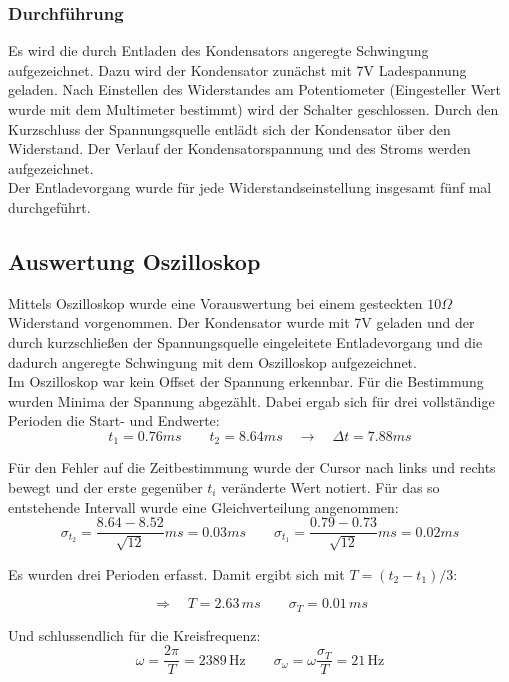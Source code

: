 \documentclass[12pt,a4paper]{article}
\begin{document}
\subsubsection{Durchführung}
Es wird die durch Entladen des Kondensators angeregte Schwingung aufgezeichnet. Dazu wird der Kondensator zunächst mit 7V Ladespannung geladen. Nach Einstellen des Widerstandes am Potentiometer (Eingesteller Wert wurde mit dem Multimeter bestimmt) wird der Schalter geschlossen. Durch den Kurzschluss der Spannungsquelle entlädt sich der Kondensator über den Widerstand. Der Verlauf der Kondensatorspannung und des Stroms werden aufgezeichnet.\\
Der Entladevorgang wurde für jede Widerstandseinstellung insgesamt fünf mal durchgeführt.

\subsection{Auswertung Oszilloskop}
Mittels Oszilloskop wurde eine Vorauswertung bei einem gesteckten $10\Omega$ Widerstand vorgenommen. Der Kondensator wurde mit 7V geladen und der durch kurzschließen der Spannungsquelle eingeleitete Entladevorgang und die dadurch angeregte Schwingung mit dem Oszilloskop aufgezeichnet.\\
Im Oszilloskop war kein Offset der Spannung erkennbar. Für die Bestimmung wurden Minima der Spannung abgezählt. Dabei ergab sich für drei vollständige Perioden die Start- und Endwerte:
\begin{equation}
t_1=0.76ms \quad \quad t_2=8.64ms \quad \rightarrow \quad \Delta t=7.88ms
\end{equation}

Für den Fehler auf die Zeitbestimmung wurde der Cursor nach links und rechts bewegt und der erste gegenüber $t_i$ veränderte Wert notiert. Für das so entstehende Intervall wurde eine Gleichverteilung angenommen:
\begin{equation}
\sigma_{t_2}=\frac{8.64-8.52}{\sqrt{12}}ms=0.03ms \quad \quad 
\sigma_{t_1}=\frac{0.79-0.73}{\sqrt{12}}ms=0.02ms
\end{equation}

Es wurden drei Perioden erfasst. Damit ergibt sich mit $T=(t_2-t_1)/3$:

\begin{equation}
\Rightarrow \quad T=2.63\, ms \quad \quad \sigma_T=0.01\, ms
\end{equation}

Und schlussendlich für die Kreisfrequenz:
\begin{equation}
\omega=\frac{2\pi}{T}=2389 \, \text{Hz} \quad \quad \sigma_{\omega}=\omega \frac{\sigma_T}{T}=21 \, \text{Hz}
\end{equation}
\end{document}
